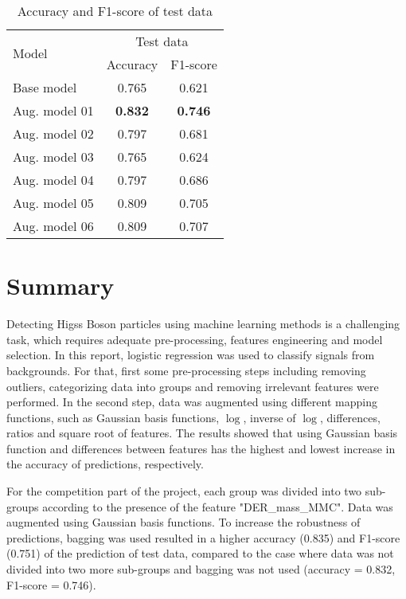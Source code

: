 \documentclass[10pt,conference,compsocconf]{IEEEtran}
\begin{document}
\begin{table}[h]
\caption{Accuracy and F1-score of test data}
\label{tab:Accuracy and F1-score of test data}
\begin{center}
\begin{tabular}{l|cc|}
\cline{2-3}
\multirow{2}{*}{Model}                   & \multicolumn{2}{c|}{Test data} \\ \cline{2-3} 
                                         & Accuracy       & F1-score      \\ \hline
\multicolumn{1}{|l|}{Base model}         & 0.765          & 0.621         \\ \hline
\multicolumn{1}{|l|}{Aug. model 01} & \textbf{0.832}          & \textbf{0.746}         \\ \hline
\multicolumn{1}{|l|}{Aug. model 02} & 0.797          & 0.681         \\ \hline
\multicolumn{1}{|l|}{Aug. model 03} & 0.765          & 0.624         \\ \hline
\multicolumn{1}{|l|}{Aug. model 04} & 0.797          & 0.686         \\ \hline
\multicolumn{1}{|l|}{Aug. model 05} & 0.809          & 0.705         \\ \hline
\multicolumn{1}{|l|}{Aug. model 06} & 0.809          & 0.707         \\ \hline
\end{tabular}
\end{center}
\end{table}
\vspace{-10pt}
\section{Summary}

Detecting Higss Boson particles using machine learning methods is a challenging task, which requires adequate pre-processing, features engineering and model selection. In this report, logistic regression was used to classify signals from backgrounds. For that, first some pre-processing steps including removing outliers, categorizing data into groups and removing irrelevant features were performed. In the second step, data was augmented using different mapping functions, such as Gaussian basis functions, $\log$, inverse of $\log$, differences, ratios and square root of features. The results showed that using Gaussian basis function and differences between features has the highest and lowest increase in the accuracy of predictions, respectively.

For the competition part of the project, each group was divided into two sub-groups according to the presence of the feature "DER\_mass\_MMC". Data was augmented using Gaussian basis functions. To increase the robustness of predictions, bagging was used resulted in a higher accuracy (0.835) and F1-score (0.751) of the prediction of test data, compared to the case where data was not divided into two more sub-groups and bagging was not used (accuracy = 0.832, F1-score = 0.746). 
\end{document}
